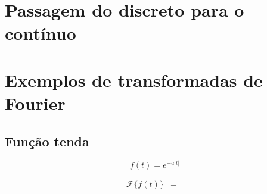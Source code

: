 \documentclass[a4paper,10pt]{book}
\begin{document}
 
 
 
 
 
 
 
 
 
 
 
 
 \section{Passagem do discreto para o contínuo}
 
 \section{Exemplos de transformadas de Fourier}
 
 
\subsection{Função tenda}

$$f(t)=e^{-a|t|}$$

\begin{eqnarray*}
 \mathcal{F}\{f(t)\}&=&
\end{eqnarray*}
\end{document}
